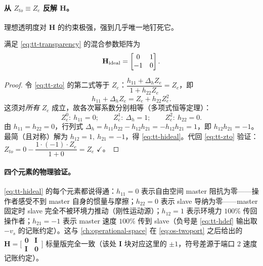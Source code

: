 \paragraph{从 $Z_{to}\equiv Z_e$ 反解 $\mathbf H$。}
理想透明度对 $\mathbf H$ 的约束极强，强到几乎唯一地钉死它。

\begin{theorem}\label{thm:tt-hideal}
满足 \cref{eq:tt-transparency} 的混合参数矩阵为
\begin{equation}
  \mathbf H_{\rm ideal}=\begin{bmatrix} 0 & 1 \\ -1 & 0 \end{bmatrix}.
  \label{eq:tt-hideal}
\end{equation}
\end{theorem}
\begin{proof}
令 \cref{eq:tt-zto} 的第二式等于 $Z_e$：$\dfrac{h_{11}+\Delta_h Z_e}{1+h_{22}Z_e}=Z_e$，即
\begin{equation}
  h_{11}+\Delta_h Z_e = Z_e + h_{22}Z_e^2.
\end{equation}
这须对\emph{所有} $Z_e$ 成立，故各次幂系数分别相等（多项式恒等定理）：
\begin{equation}
  Z_e^0:\ h_{11}=0;\qquad
  Z_e^1:\ \Delta_h=1;\qquad
  Z_e^2:\ h_{22}=0.
\end{equation}
由 $h_{11}=h_{22}=0$，行列式 $\Delta_h=h_{11}h_{22}-h_{12}h_{21}=-h_{12}h_{21}=1$，即 $h_{12}h_{21}=-1$。最简（且对称）解为 $h_{12}=1,\ h_{21}=-1$，得 \cref{eq:tt-hideal}。代回 \cref{eq:tt-zto} 验证：$Z_{to}=0-\dfrac{1\cdot(-1)\cdot Z_e}{1+0}=Z_e$ $\checkmark$。
\end{proof}

\paragraph{四个元素的物理验证。}
\cref{eq:tt-hideal} 的每个元素都说得通：$h_{11}=0$ 表示自由空间 master 阻抗为零——操作者感受不到 master 自身的惯量与摩擦；$h_{22}=0$ 表示 slave 导纳为零——master 固定时 slave 完全不被环境力推动（刚性运动源）；$h_{12}=1$ 表示环境力 $100\%$ 传回操作者；$h_{21}=-1$ 表示 master 速度 $100\%$ 传到 slave（负号是 \cref{eq:tt-hdef} 输出取 $-v_s$ 的记账约定）。这与 \cref{ch:operational-space} 在 \cref{eq:os-twoport} 之后给出的 $\mathbf H=\bigl[\begin{smallmatrix}\mathbf 0&\mathbf I\\\mathbf I&\mathbf 0\end{smallmatrix}\bigr]$ 标量版完全一致（该处 $\mathbf I$ 块对应这里的 $\pm1$，符号差源于端口 2 速度记账约定）。

